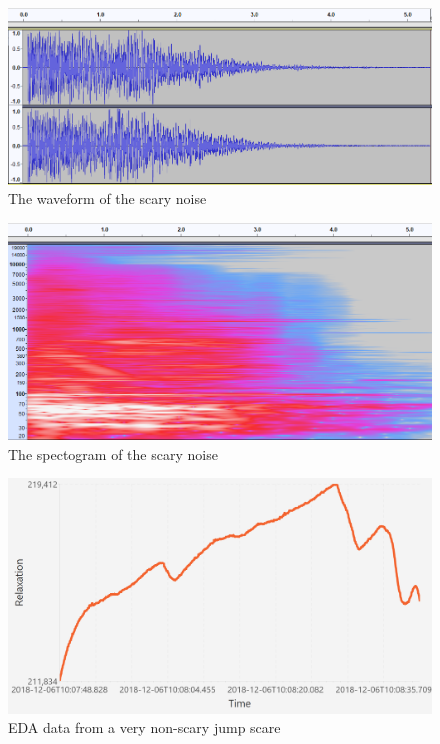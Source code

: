 \documentclass[12pt,a4paper]{article}
\begin{document}
\begin{figure}[!htbp]
		\begin{center}
\includegraphics[width=0.8\linewidth]{waveform.png}
\caption{The waveform of the scary noise}
\end{center}
\end{figure}

\begin{figure}[!htbp]
		\begin{center}
\includegraphics[width=0.8\linewidth]{spectogram.png}
\caption{The spectogram of the scary noise}
\end{center}
\end{figure}

\begin{figure}[!htbp]
	\begin{center}
	\includegraphics[width=0.8\linewidth]{boo.png}
	\caption{EDA data from a very non-scary jump scare}
\end{center}
\end{figure}
\FloatBarrier
\end{document}
